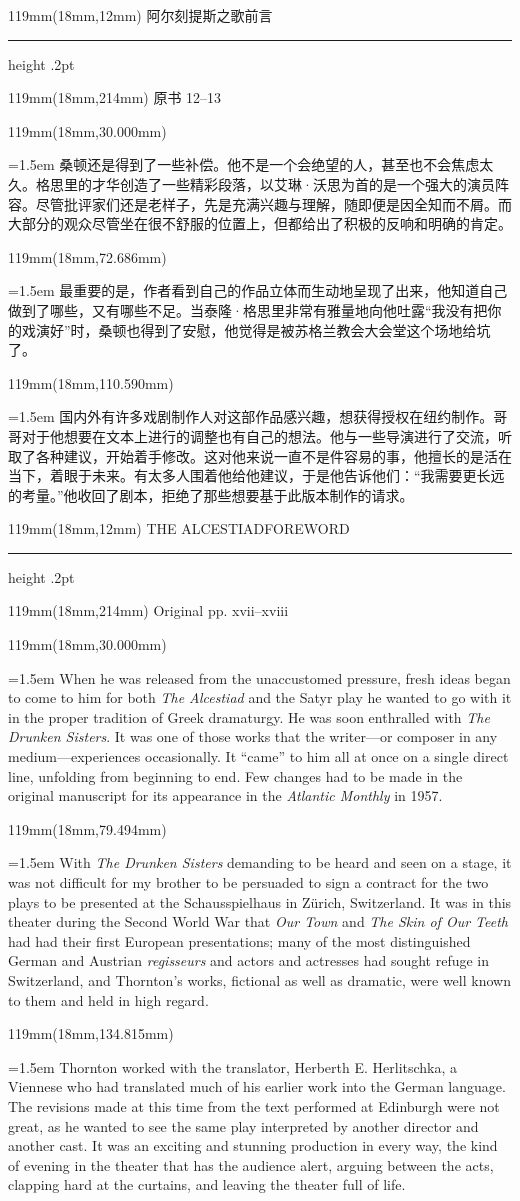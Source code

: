 \documentclass{article}
\newcommand{\ENsetup}{\normalfont\color{ink}\fontsize{11}{16.5}\selectfont\emergencystretch=1.5em}
\newcommand{\ZHsetup}{\normalfont\color{ink}\fontsize{10.5}{17}\selectfont\emergencystretch=1.5em}
\newcommand{\Block}[3]{\begin{textblock*}{119mm}(18mm,#1mm){#2 #3\par}\end{textblock*}}
\newcommand{\Heading}[3]{%
  \begin{textblock*}{119mm}(18mm,12mm)
    \color{quiet}\fontsize{7.5}{10}\selectfont
    #1\hfill #2\par\vspace{3mm}\hrule height .2pt
  \end{textblock*}
  \begin{textblock*}{119mm}(18mm,214mm)
    \color{quiet}\fontsize{7}{10}\selectfont #3\hfill\thepage
  \end{textblock*}
}
\begin{document}
\newpage
\null
\Heading{阿尔刻提斯之歌}{前言}{原书 12–13}
\Block{30.000}{\ZHsetup}{桑顿还是得到了一些补偿。他不是一个会绝望的人，甚至也不会焦虑太久。格思里的才华创造了一些精彩段落，以艾琳·沃思为首的是一个强大的演员阵容。尽管批评家们还是老样子，先是充满兴趣与理解，随即便是因全知而不屑。而大部分的观众尽管坐在很不舒服的位置上，但都给出了积极的反响和明确的肯定。\par }
\Block{72.686}{\ZHsetup}{最重要的是，作者看到自己的作品立体而生动地呈现了出来，他知道自己做到了哪些，又有哪些不足。当泰隆·格思里非常有雅量地向他吐露“我没有把你的戏演好”时，桑顿也得到了安慰，他觉得是被苏格兰教会大会堂这个场地给坑了。\par }
\Block{110.590}{\ZHsetup}{国内外有许多戏剧制作人对这部作品感兴趣，想获得授权在纽约制作。哥哥对于他想要在文本上进行的调整也有自己的想法。他与一些导演进行了交流，听取了各种建议，开始着手修改。这对他来说一直不是件容易的事，他擅长的是活在当下，着眼于未来。有太多人围着他给他建议，于是他告诉他们：“我需要更长远的考量。”他收回了剧本，拒绝了那些想要基于此版本制作的请求。\par }
\newpage
\null
\Heading{THE ALCESTIAD}{FOREWORD}{Original pp. xvii–xviii}
\Block{30.000}{\ENsetup}{When he was released from the unaccustomed pressure, fresh ideas began to come to him for both \textit{The Alcestiad} and the Satyr play he wanted to go with it in the proper tradition of Greek dramaturgy. He was soon enthralled with \textit{The Drunken Sisters}. It was one of those works that the writer—or composer in any medium—experiences occasionally. It ``came'' to him all at once on a single direct line, unfolding from beginning to end. Few changes had to be made in the original manuscript for its appearance in the \textit{Atlantic Monthly} in 1957.\par}
\Block{79.494}{\ENsetup}{With \textit{The Drunken Sisters} demanding to be heard and seen on a stage, it was not difficult for my brother to be persuaded to sign a contract for the two plays to be presented at the Schausspielhaus in Zürich, Switzerland. It was in this theater during the Second World War that \textit{Our Town} and \textit{The Skin of Our Teeth} had had their first European presentations; many of the most distinguished German and Austrian \textit{regisseurs} and actors and actresses had sought refuge in Switzerland, and Thornton's works, fictional as well as dramatic, were well known to them and held in high regard.\par}
\Block{134.815}{\ENsetup}{Thornton worked with the translator, Herberth E. Herlitschka, a Viennese who had translated much of his earlier work into the German language. The revisions made at this time from the text performed at Edinburgh were not great, as he wanted to see the same play interpreted by another director and another cast. It was an exciting and stunning production in every way, the kind of evening in the theater that has the audience alert, arguing between the acts, clapping hard at the curtains, and leaving the theater full of life.\par}
\end{document}
